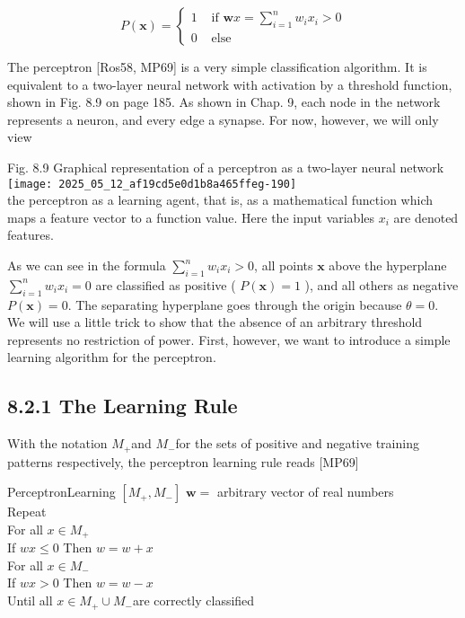 \documentclass[10pt]{article}
\begin{document}
$$
P(\boldsymbol{x})= \begin{cases}1 & \text { if } \boldsymbol{w} x=\sum_{i=1}^{n} w_{i} x_{i}>0 \\ 0 & \text { else }\end{cases}
$$

The perceptron [Ros58, MP69] is a very simple classification algorithm. It is equivalent to a two-layer neural network with activation by a threshold function, shown in Fig. 8.9 on page 185. As shown in Chap. 9, each node in the network represents a neuron, and every edge a synapse. For now, however, we will only view

Fig. 8.9 Graphical representation of a perceptron as a two-layer neural network\\
\texttt{[image: 2025\_05\_12\_af19cd5e0d1b8a465ffeg-190]}\\
the perceptron as a learning agent, that is, as a mathematical function which maps a feature vector to a function value. Here the input variables $x_{i}$ are denoted features.

As we can see in the formula $\sum_{i=1}^{n} w_{i} x_{i}>0$, all points $\boldsymbol{x}$ above the hyperplane $\sum_{i=1}^{n} w_{i} x_{i}=0$ are classified as positive ( $P(\boldsymbol{x})=1$ ), and all others as negative $P(\boldsymbol{x})=0$. The separating hyperplane goes through the origin because $\theta=0$. We will use a little trick to show that the absence of an arbitrary threshold represents no restriction of power. First, however, we want to introduce a simple learning algorithm for the perceptron.

\subsection*{8.2.1 The Learning Rule}
With the notation $M_{+}$and $M_{-}$for the sets of positive and negative training patterns respectively, the perceptron learning rule reads [MP69]

PerceptronLearning $\left[M_{+}, M_{-}\right]$ $\boldsymbol{w}=$ arbitrary vector of real numbers\\
Repeat\\
For all $x \in M_{+}$\\
If $w x \leq 0$ Then $w=w+x$\\
For all $x \in M_{-}$\\
If $w x>0$ Then $w=w-x$\\
Until all $x \in M_{+} \cup M_{-}$are correctly classified
\end{document}
